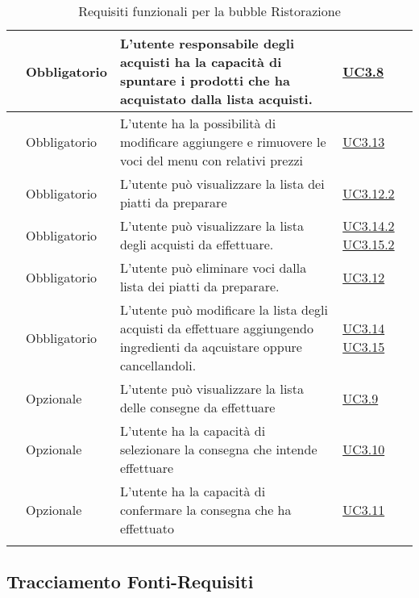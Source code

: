 \begin{longtable}{|P{1.5cm}|P{2.5cm}|P{6.5cm}|P{2.5cm}|}
	\hline \RequisitoObF\label{L28} & Obbligatorio & L'utente responsabile degli acquisti ha la capacità di spuntare i prodotti che ha acquistato dalla lista acquisti.
	 & \hyperref[UC3.8]{UC3.8} \\
	\hline \RequisitoObF\label{L29} & Obbligatorio & L'utente  ha la possibilità di modificare aggiungere e rimuovere le voci del menu con relativi prezzi & \hyperref[UC3.13]{UC3.13} \\
	\hline \RequisitoObF\label{L30} & Obbligatorio & L'utente  può visualizzare la lista dei piatti da preparare & \hyperref[UC3.12.2]{UC3.12.2} \\
	\hline \RequisitoObF\label{L31} & Obbligatorio & L'utente  può visualizzare la lista degli acquisti da effettuare. & \hyperref[UC3.14.2]{UC3.14.2} \hyperref[UC3.15.2]{UC3.15.2} \\
	\hline \RequisitoObF\label{L32} & Obbligatorio & L'utente  può eliminare voci dalla lista dei piatti da preparare. & \hyperref[UC3.12]{UC3.12} \\
	\hline \RequisitoObF\label{L53} & Obbligatorio & L'utente  può modificare la lista degli acquisti da effettuare aggiungendo ingredienti da aqcuistare oppure cancellandoli.
	 & \hyperref[UC3.14]{UC3.14} \linebreak \hyperref[UC3.15]{UC3.15} \\	 
	\hline \RequisitoOpF\label{L50} & Opzionale & L'utente  può visualizzare la lista delle consegne da effettuare & \hyperref[UC3.9]{UC3.9} \\
	\hline \RequisitoOpF\label{L51} & Opzionale & L'utente  ha la capacità di selezionare la consegna che intende effettuare & \hyperref[UC3.10]{UC3.10} \\
	\hline \RequisitoOpF\label{L52} & Opzionale & L'utente  ha la capacità di confermare la consegna che ha effettuato & \hyperref[UC3.11]{UC3.11} \\
	\hline
	\caption{Requisiti funzionali per la bubble Ristorazione}
\end{longtable}

\subsection{Tracciamento Fonti-Requisiti}

